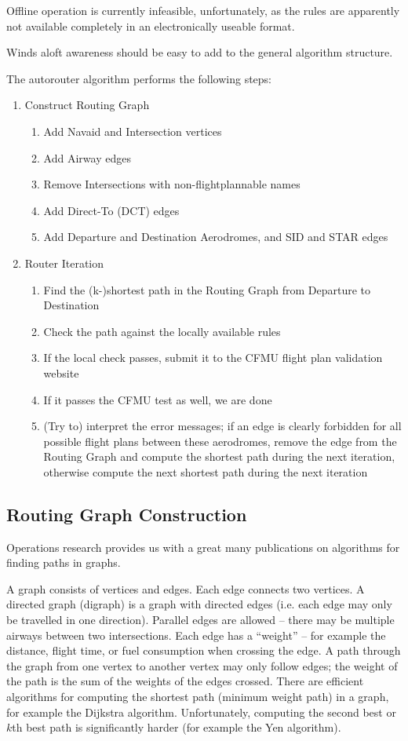 \documentclass[a4paper,10pt,pdftex]{article}
\begin{document}
Offline operation is currently infeasible, unfortunately, as the rules
are apparently not available completely in an electronically useable
format.

Winds aloft awareness should be easy to add to the general algorithm
structure.

The autorouter algorithm performs the following steps:

\begin{enumerate}
\item Construct Routing Graph
  \begin{enumerate}
  \item Add Navaid and Intersection vertices
  \item Add Airway edges
  \item Remove Intersections with non-flightplannable names
  \item Add Direct-To (DCT) edges
  \item Add Departure and Destination Aerodromes, and SID and STAR edges
  \end{enumerate}
\item Router Iteration
  \begin{enumerate}
  \item Find the (k-)shortest path in the Routing Graph from Departure
    to Destination
  \item Check the path against the locally available rules
  \item If the local check passes, submit it to the CFMU flight plan
    validation website
  \item If it passes the CFMU test as well, we are done
  \item (Try to) interpret the error messages; if an edge is clearly
    forbidden for all possible flight plans between these aerodromes,
    remove the edge from the Routing Graph and compute the shortest
    path during the next iteration, otherwise compute the next
    shortest path during the next iteration
  \end{enumerate}
\end{enumerate}

\subsection{Routing Graph Construction}

Operations research provides us with a great many publications on
algorithms for finding paths in graphs.

A graph consists of vertices and edges. Each edge connects two
vertices. A directed graph (digraph) is a graph with directed edges
(i.e. each edge may only be travelled in one direction). Parallel
edges are allowed -- there may be multiple airways between two
intersections. Each edge has a ``weight'' -- for example the distance,
flight time, or fuel consumption when crossing the edge. A path
through the graph from one vertex to another vertex may only follow
edges; the weight of the path is the sum of the weights of the edges
crossed. There are efficient algorithms for computing the shortest
path (minimum weight path) in a graph, for example the Dijkstra
algorithm. Unfortunately, computing the second best or $k$th best path
is significantly harder (for example the Yen algorithm).
\end{document}
